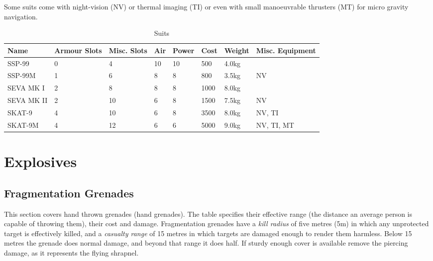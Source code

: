 Some suits come with night-vision (NV) or thermal imaging (TI) or even with
small manoeuvrable thrusters (MT) for micro gravity navigation.

\begin{table}
  \caption{Suits}
  \label{tab:Suits}
  \begin{center}
    \begin{tabular}{| l | l | l | l | l | l | l | l |}

      \hline
      \textbf{Name} & \textbf{Armour Slots} & \textbf{Misc. Slots} &
      \textbf{Air} & \textbf{Power} & \textbf{Cost} & \textbf{Weight} &
      \textbf{Misc. Equipment} \\ \hline

      SSP-99     & 0 &  4 & 10 & 10 &  500 & 4.0kg & \\ \hline
      SSP-99M    & 1 &  6 &  8 &  8 &  800 & 3.5kg & NV \\ \hline

      SEVA MK I  & 2 &  8 &  8 &  8 & 1000 & 8.0kg & \\ \hline
      SEVA MK II & 2 & 10 &  6 &  8 & 1500 & 7.5kg & NV \\ \hline

      SKAT-9     & 4 & 10 &  6 &  8 & 3500 & 8.0kg & NV, TI \\ \hline
      SKAT-9M    & 4 & 12 &  6 &  6 & 5000 & 9.0kg & NV, TI, MT \\ \hline

    \end{tabular}
  \end{center}
\end{table}


\section{Explosives}
\label{sec:9-Explosives}

\subsection{Fragmentation Grenades}
\label{sub:9-Fragmentation Grenades}

This section covers hand thrown grenades (hand grenades). The table specifies
their effective range (the distance an average person is capable of throwing
them), their cost and damage. Fragmentation grenades have a \emph{kill radius}
of five metres (5m) in which any unprotected target is effectively killed, and
a \emph{casualty range} of 15 metres in which targets are damaged enough to
render them harmless. Below 15 metres the grenade does normal damage, and
beyond that range it does half. If sturdy enough cover is available remove
the piercing damage, as it represents the flying shrapnel.

